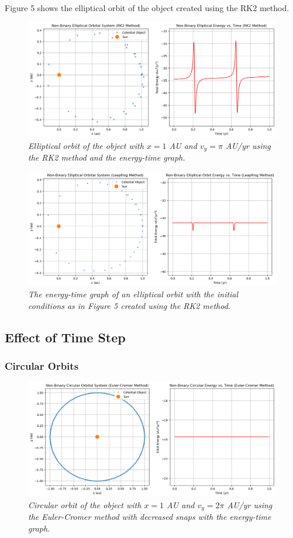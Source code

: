 \documentclass[11 pt, a4paper]{article}
\begin{document}
Figure 5 shows the elliptical orbit of the object created using the RK2 method.
\begin{figure}[H]
  \includegraphics[width=1\linewidth]{RK2/rk2elliptic.png}
  \centering
  \caption{\textit{Elliptical orbit of the object with $x = 1$ AU and $v_y = \pi$ AU/yr using the RK2 method and the energy-time graph.}} 
\end{figure}


\begin{figure}[H]
  \includegraphics[width=1\linewidth]{Leapfrog/leapfrogelliptic.png}
  \centering
  \caption{\textit{The energy-time graph of an elliptical orbit with the initial conditions as in Figure 5 created using the RK2 method.}}
\end{figure}

\subsection{Effect of Time Step}
\subsubsection{Circular Orbits}
\begin{figure}[H]
  \includegraphics[width=0.7\linewidth]{Euler cromer/eulercromercircularincrease.png}
  \centering
  \caption{\textit{Circular orbit of the object with $x = 1$ AU and $v_y = 2\pi$ AU/yr using the Euler-Cromer method with decreased snaps with the energy-time graph.}} 
\end{figure}
\end{document}
